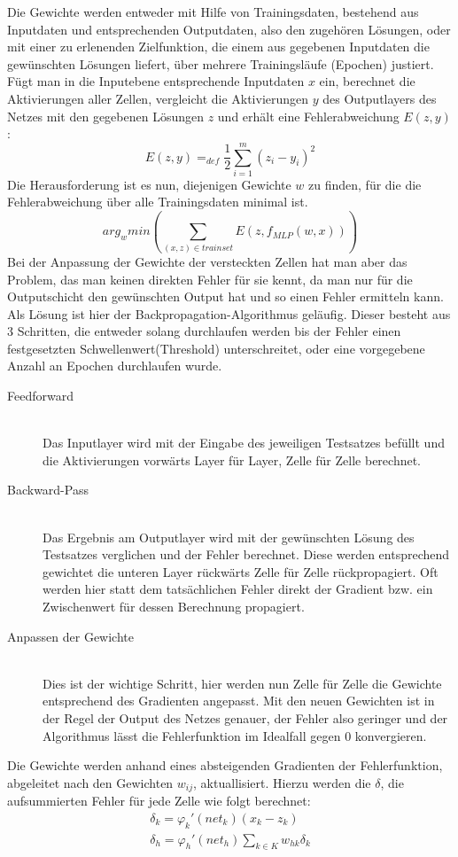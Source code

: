 Die Gewichte werden entweder mit Hilfe von Trainingsdaten, bestehend aus Inputdaten und entsprechenden Outputdaten, also den zugehören Lösungen, oder mit einer zu erlenenden Zielfunktion, die einem aus gegebenen Inputdaten die gewünschten Lösungen liefert, über mehrere Trainingsläufe (Epochen) justiert. Fügt man in die Inputebene entsprechende Inputdaten \(x\) ein, berechnet die Aktivierungen aller Zellen, vergleicht die Aktivierungen \(y\) des Outputlayers des Netzes mit den gegebenen Lösungen \(z\) und erhält eine Fehlerabweichung \( E(z,y)\): 
\begin{equation}
E(z,y) =_{def} \dfrac{1}{2} \sum_{i=1}^{m}(z_{i}-y_{i})^{2}
	\label{eq:err}
\end{equation}
Die Herausforderung ist es nun, diejenigen Gewichte \(w\) zu finden, für die die Fehlerabweichung über alle Trainingsdaten minimal ist.
\begin{equation}
arg_{w} min( \sum_{(x,z)\in trainset} E(z,f_{MLP}(w,x)))
\label{eq:err}
\end{equation}
Bei der Anpassung der Gewichte der versteckten Zellen hat man aber das Problem, das man keinen direkten Fehler für sie kennt, da man nur für die Outputschicht den gewünschten Output hat und so einen Fehler ermitteln kann. Als Lösung ist hier der Backpropagation-Algorithmus geläufig. Dieser besteht aus 3 Schritten, die entweder solang durchlaufen werden bis der Fehler einen festgesetzten Schwellenwert(Threshold) unterschreitet, oder eine vorgegebene Anzahl an Epochen durchlaufen wurde. 
\begin{description}	\item[Feedforward]\hfill \\
	Das Inputlayer wird mit der Eingabe des jeweiligen Testsatzes befüllt und die Aktivierungen vorwärts Layer für Layer, Zelle für Zelle berechnet.  
	\item[Backward-Pass]\hfill \\ 
	Das Ergebnis am Outputlayer wird mit der gewünschten Lösung des Testsatzes verglichen und der Fehler berechnet. Diese werden entsprechend gewichtet die unteren Layer rückwärts Zelle für Zelle rückpropagiert. Oft werden hier statt dem tatsächlichen Fehler direkt der Gradient bzw. ein Zwischenwert für dessen Berechnung propagiert.
	\item[Anpassen der Gewichte]\hfill \\ Dies ist der wichtige Schritt, hier werden nun Zelle für Zelle die Gewichte entsprechend des Gradienten angepasst. Mit den neuen Gewichten ist in der Regel der Output des Netzes genauer, der Fehler also geringer und der Algorithmus lässt die Fehlerfunktion im Idealfall gegen 0 konvergieren. \cite{bib:aneuron}
\end{description}
Die Gewichte werden anhand eines absteigenden Gradienten der Fehlerfunktion, abgeleitet nach den Gewichten \(w_{ij}\), aktuallisiert.  Hierzu werden die \(\delta\), die aufsummierten Fehler für jede Zelle wie folgt berechnet: 
\begin{gather}
\delta_{k} = \varphi_{k}'(net_{k})(x_{k}-z_{k}) \\
\delta_{h} = \varphi_{h}'(net_{h})\sum_{k\in K}w_{hk}\delta_{k} 
\label{eq:err}
\end{gather}

